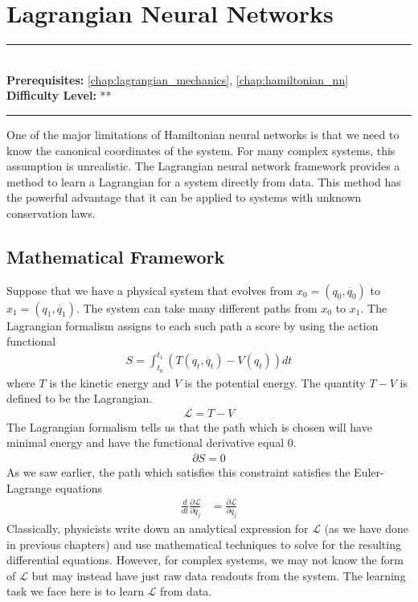 \documentclass[book.tex]{subfiles}
\begin{document}
\chapter{Lagrangian Neural Networks}
\label{chap:lagrangian_nn}
\noindent\rule{11cm}{0.4pt} \\
\textbf{Prerequisites:} \autoref{chap:lagrangian_mechanics}, \autoref{chap:hamiltonian_nn} \\
\textbf{Difficulty Level:} ** \\
\noindent\rule{11cm}{0.4pt}
\vspace{5mm}

One of the major limitations of Hamiltonian neural networks is that we need to know the canonical coordinates of the system. For many complex systems, this assumption is unrealistic. The Lagrangian neural network framework provides a method to learn a Lagrangian for a system directly from data. This method has the powerful advantage that it can be applied to systems with unknown conservation laws.

\section{Mathematical Framework}

Suppose that we have a physical system that evolves from $x_0 = (q_0, \dot{q_0})$ to $x_1=(q_1, \dot{q_1})$. The system can take many different paths from $x_0$ to $x_1$. The Lagrangian formalism assigns to each such path a score by using the action functional
\begin{align}
    S = \int_{t_0}^{t_1} (T(q_t, \dot{q_t}) - V(q_t)) dt
\end{align}
where $T$ is the kinetic energy and $V$ is the potential energy. The quantity $T - V$ is defined to be the Lagrangian.
\begin{align}
    \mathcal{L} = T - V
\end{align}
The Lagrangian formalism tells us that the path which is chosen will have minimal energy and have the functional derivative equal 0.
\begin{align}
    \partial S = 0
\end{align}
As we saw earlier, the path which satisfies this constraint satisfies the Euler-Lagrange equations
\begin{align}
    \frac{d}{dt}\frac{\partial \mathcal{L}}{\partial \dot{q_j}} &= \frac{\partial \mathcal{L}}{\partial q_j}
\end{align}
Classically, physicists write down an analytical expression for $\mathcal{L}$ (as we have done in previous chapters) and use mathematical techniques to solve for the resulting differential equations. However, for complex systems, we may not know the form of $\mathcal{L}$ but may instead have just raw data readouts from the system. The learning task we face here is to learn $\mathcal{L}$ from data.
\end{document}
